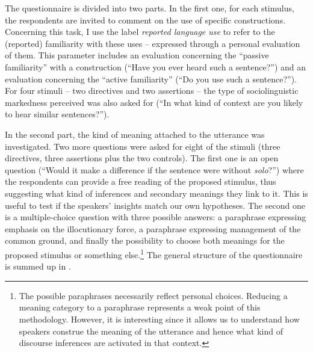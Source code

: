 The questionnaire is divided into two parts. In the first one, for each stimulus, the respondents are invited to comment on the use of specific constructions. Concerning this task, I use the label \textit{reported language use} to refer to the (reported) familiarity with these uses – expressed through a personal evaluation of them. This parameter includes an evaluation concerning the “passive familiarity” with a construction (“Have you ever heard such a sentence?”) and an evaluation concerning the “active familiarity” (“Do you use such a sentence?”). For four stimuli – two directives and two assertions – the type of sociolinguistic markedness perceived was also asked for (“In what kind of context are you likely to hear similar sentences?”).

In the second part, the kind of meaning attached to the utterance was investigated. Two more questions were asked for eight of the stimuli (three directives, three assertions plus the two controls). The first one is an open question (“Would it make a difference if the sentence were without \textit{solo}?”) where the respondents can provide a free reading of the proposed stimulus, thus suggesting what kind of inferences and secondary meanings they link to it. This is useful to test if the speakers’ insights match our own hypotheses. The second one is a multiple-choice question with three possible answers: a paraphrase expressing emphasis on the illocutionary force, a paraphrase expressing management of the common ground, and finally the possibility to choose both meanings for the proposed stimulus or something else.\footnote{The possible paraphrases necessarily reflect personal choices. Reducing a meaning category to a paraphrase represents a weak point of this methodology. However, it is interesting since it allows us to understand how speakers construe the meaning of the utterance and hence what kind of discourse inferences are activated in that context.} The general structure of the questionnaire is summed up in .

